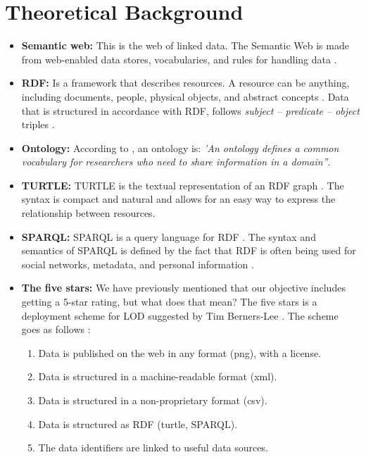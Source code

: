 \chapter{Theoretical Background}

\begin{itemize}
\item \textbf{Semantic web:} This is the web of linked data. The Semantic Web is made from web-enabled data stores, vocabularies, and rules for handling data \cite{semantic}.

\item \textbf{RDF:} Is a framework that describes resources. A resource can be anything, including documents, people, physical objects, and abstract concepts \cite{rdf}. Data that is structured in accordance with RDF, follows \textit{subject – predicate – object} triples \cite{rdf}.

\item \textbf{Ontology:} According to \cite{ontology}, an ontology is: \textit{'An ontology defines a common vocabulary for researchers who need to share information in a domain''}.

\item \textbf{TURTLE:} TURTLE is the textual representation of an RDF graph \cite{turtle}. The syntax is compact and natural and allows for an easy way to express the relationship between resources.

\item \textbf{SPARQL:} SPARQL is a query language for RDF \cite{sparql}. The syntax and semantics of SPARQL is defined by the fact that RDF is often being used for social networks, metadata, and personal information \cite{sparql}.

\item \textbf{The five stars:} We have previously mentioned that our objective includes getting a 5-star rating, but what does that mean? The five stars is a deployment scheme for LOD suggested by Tim Berners-Lee \cite{lod}. The scheme goes as follows \cite{lod}:

	\begin{enumerate}
	\item Data is published on the web in any format (png), with a license.
	\item Data is structured in a machine-readable format (xml).
	\item Data is structured in a non-proprietary format (csv).
	\item Data is structured as RDF (turtle, SPARQL).
	\item The data identifiers are linked to useful data sources.
	\end{enumerate}

\end{itemize}

